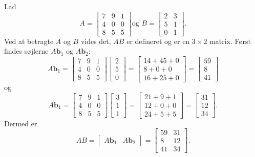 \begin{eks}
Lad 
$$
A=
\begin{bmatrix}
7 & 9 & 1 \\
4 & 0 & 0 \\
8 & 5 & 5
\end{bmatrix}
\text{og }
B=
\begin{bmatrix}
2 & 3 \\
5 & 1 \\
0 & 1 
\end{bmatrix}
\text{.}
$$
Ved at betragte $A$ og $B$ vides det, $AB$ er defineret og er en $3 \times 2$ matrix. 
Først findes søjlerne $A\textbf{b}_1$ og $A\textbf{b}_2$:
$$
A\textbf{b}_1=
\begin{bmatrix}
7 & 9 & 1 \\
4 & 0 & 0 \\
8 & 5 & 5
\end{bmatrix}
\begin{bmatrix}
2 \\
5 \\
0
\end{bmatrix}
=
\begin{bmatrix}
14 + 45 + 0 \\
8 + 0 + 0 \\
16 + 25 + 0
\end{bmatrix}
=
\begin{bmatrix}
59 \\
8 \\
41
\end{bmatrix}
$$
og
$$
A\textbf{b}_1=
\begin{bmatrix}
7 & 9 & 1 \\
4 & 0 & 0 \\
8 & 5 & 5
\end{bmatrix}
\begin{bmatrix}
3 \\
1 \\
1
\end{bmatrix}
=
\begin{bmatrix}
21 + 9 + 1 \\
12 + 0 + 0 \\
24 + 5 + 5
\end{bmatrix}
=
\begin{bmatrix}
31 \\
12 \\
34
\end{bmatrix}
\text{.}
$$
Dermed er 
$$
AB=
\begin{bmatrix}
A\textbf{b}_1 & A\textbf{b}_2
\end{bmatrix}
=
\begin{bmatrix}
59 & 31 \\
8 & 12 \\
41 & 34
\end{bmatrix}.
$$
\end{eks}
